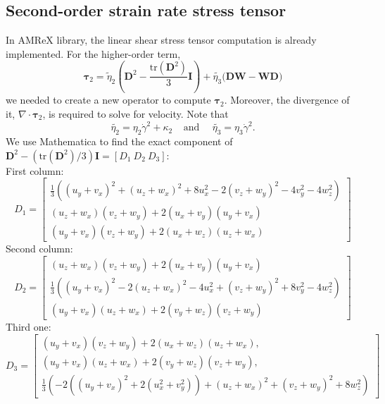 \subsection{Second-order strain rate stress tensor}
In AMReX library, the linear shear stress tensor computation is already implemented. For the higher-order term,
\[
  {\bm \tau}_{2} = 
  \tilde{\eta}_2
  \left( {\bm D}^2  - \frac{\text{tr}\left({\bm D}^2\right)}{3}{\bm I} \right)
  + \tilde{\eta_3} 
  \biggl( {\bm{DW}} - {\bm{WD}} \biggr)  
\]
we needed to create a new operator to compute $ {\bm \tau}_{2}$. Moreover, the divergence of it, $\nabla \cdot {\bm \tau}_{2}$, is required to solve for velocity. Note that 
\[
\tilde{\eta_2} =  \eta_2  \dot{\gamma}^2
+  \kappa_2 
\ \ \ \ \ \text{and} \ \ \ \ \ \
\tilde{\eta_3} =    \eta_3 \dot{\gamma}^2 .
\]
We use Mathematica to find the exact component of  ${\bm D}^2 - (\text{tr}({\bm D}^2)/3) {\bm I} = \left[ D_1  \ D_2 \ D_3 \right]$:
\\
First column:
\[
D_1 =
\begin{bmatrix}
   \frac{1}{3} \left(\left(u_y+v_x\right)^2+\left(u_z+w_x\right)^2+8 u_x^2-2 \left(v_z+w_y\right)^2-4 v_y^2-4 w_z^2\right)
   \\
   \left(u_z+w_x\right) \left(v_z+w_y\right)+2 \left(u_x+v_y\right) \left(u_y+v_x\right)
   \\
   \left(u_y+v_x\right) \left(v_z+w_y\right)+2 \left(u_x+w_z\right) \left(u_z+w_x\right)
\end{bmatrix}
\]
Second column:
\[
D_2 = 
\begin{bmatrix}
   \left(u_z+w_x\right) \left(v_z+w_y\right)+2 \left(u_x+v_y\right) \left(u_y+v_x\right)
   \\
   \frac{1}{3} \left(\left(u_y+v_x\right)^2-2 \left(u_z+w_x\right)^2-4 u_x^2+\left(v_z+w_y\right)^2+8 v_y^2-4 w_z^2\right)
   \\
   \left(u_y+v_x\right) \left(u_z+w_x\right)+2 \left(v_y+w_z\right) \left(v_z+w_y\right)
\end{bmatrix}
\]
Third one:
\[
D_3 = 
\begin{bmatrix}
   \left(u_y+v_x\right) \left(v_z+w_y\right)+2 \left(u_x+w_z\right) \left(u_z+w_x\right),
    \\
   \left(u_y+v_x\right) \left(u_z+w_x\right)+2 \left(v_y+w_z\right) \left(v_z+w_y\right),
   \\
   \frac{1}{3} \left(-2 \left(\left(u_y+v_x\right)^2+2 \left(u_x^2+v_y^2\right)\right)+\left(u_z+w_x\right)^2+\left(v_z+w_y\right)^2+8 w_z^2\right)
\end{bmatrix}
\]
